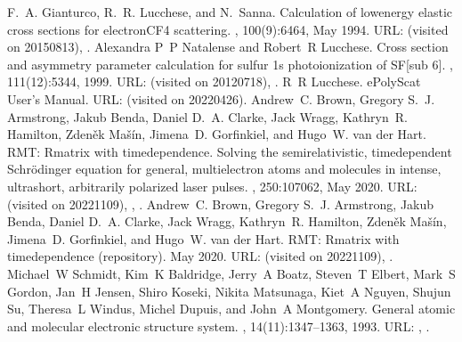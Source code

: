 \documentclass[letterpaper,table,10pt,english]{jupyterBook}
\begin{document}
\begin{sphinxthebibliography}{10}
\sphinxAtStartPar
F. A. Gianturco, R. R. Lucchese, and N. Sanna. Calculation of low\sphinxhyphen{}energy elastic cross sections for electron\sphinxhyphen{}CF4 scattering. , 100(9):6464, May 1994. URL:  (visited on 2015\sphinxhyphen{}08\sphinxhyphen{}13), .
\sphinxAtStartPar
Alexandra P P Natalense and Robert R Lucchese. Cross section and asymmetry parameter calculation for sulfur 1s photoionization of SF{[}sub 6{]}. , 111(12):5344, 1999. URL:  (visited on 2012\sphinxhyphen{}07\sphinxhyphen{}18), .
\sphinxAtStartPar
R R Lucchese. ePolyScat User's Manual. URL:  (visited on 2022\sphinxhyphen{}04\sphinxhyphen{}26).
\sphinxAtStartPar
Andrew C. Brown, Gregory S. J. Armstrong, Jakub Benda, Daniel D. A. Clarke, Jack Wragg, Kathryn R. Hamilton, Zdeněk Mašín, Jimena D. Gorfinkiel, and Hugo W. van der Hart. RMT: R\sphinxhyphen{}matrix with time\sphinxhyphen{}dependence. Solving the semi\sphinxhyphen{}relativistic, time\sphinxhyphen{}dependent Schrödinger equation for general, multielectron atoms and molecules in intense, ultrashort, arbitrarily polarized laser pulses. , 250:107062, May 2020. URL:  (visited on 2022\sphinxhyphen{}11\sphinxhyphen{}09), , .
\sphinxAtStartPar
Andrew C. Brown, Gregory S. J. Armstrong, Jakub Benda, Daniel D. A. Clarke, Jack Wragg, Kathryn R. Hamilton, Zdeněk Mašín, Jimena D. Gorfinkiel, and Hugo W. van der Hart. RMT: R\sphinxhyphen{}matrix with time\sphinxhyphen{}dependence (repository). May 2020. URL:  (visited on 2022\sphinxhyphen{}11\sphinxhyphen{}09), .
\sphinxAtStartPar
Michael W Schmidt, Kim K Baldridge, Jerry A Boatz, Steven T Elbert, Mark S Gordon, Jan H Jensen, Shiro Koseki, Nikita Matsunaga, Kiet A Nguyen, Shujun Su, Theresa L Windus, Michel Dupuis, and John A Montgomery. General atomic and molecular electronic structure system. , 14(11):1347–1363, 1993. URL: , .

\end{sphinxthebibliography}
\end{document}
